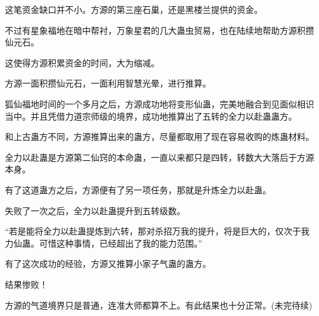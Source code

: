 \begin{this_body}
这笔资金缺口并不小。方源的第三座石巢，还是黑楼兰提供的资金。

不过有星象福地在暗中帮衬，万象星君的几大蛊虫贸易，也在陆续地帮助方源积攒仙元石。

这使得方源积累资金的时间，大为缩减。

方源一面积攒仙元石，一面利用智慧光晕，进行推算。

狐仙福地时间的一个多月之后，方源成功地将变形仙蛊，完美地融合到见面似相识当中。并且凭借力道宗师级的境界，成功地推算出了五转的全力以赴蛊蛊方。

和上古蛊方不同，方源推算出来的蛊方，尽量都取用了现在容易收购的炼蛊材料。

全力以赴蛊是方源第二仙窍的本命蛊，一直以来都只是四转，转数大大落后于方源本身。

有了这道蛊方之后，方源便有了另一项任务，那就是升炼全力以赴蛊。

失败了一次之后，全力以赴蛊提升到五转级数。

“若是能将全力以赴蛊提炼到六转，那对杀招万我的提升，将是巨大的，仅次于我力仙蛊。可惜这种事情，已经超出了我的能力范围。”

有了这次成功的经验，方源又推算小家子气蛊的蛊方。

结果惨败！

方源的气道境界只是普通，连准大师都算不上。有此结果也十分正常。(未完待续)

\end{this_body}

